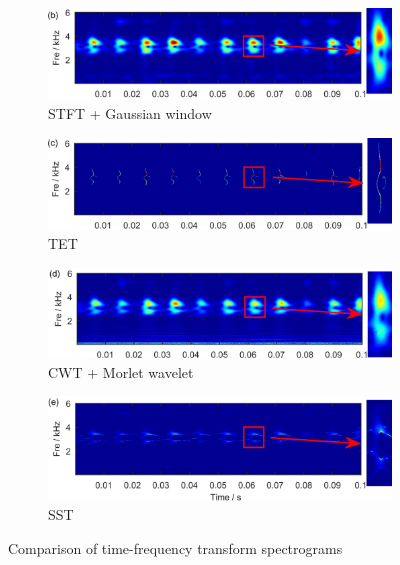\begin{figure}[ht]
    \centering
    \begin{subfigure}[b]{0.49\textwidth}
        \includegraphics[width=\textwidth]{assets/stft-spectrogram-sample.png}
        \caption{STFT + Gaussian window}
    \end{subfigure}
    \hfill
    \begin{subfigure}[b]{0.49\textwidth}
        \includegraphics[width=\textwidth]{assets/tet-spectrogram-sample.png}
        \caption{TET}
    \end{subfigure}
    \hfill
    \begin{subfigure}[b]{0.49\textwidth}
        \includegraphics[width=\textwidth]{assets/wt-spectrogram-sample.png}
        \caption{CWT + Morlet wavelet}
    \end{subfigure}
    \hfill
    \begin{subfigure}[b]{0.49\textwidth}
        \includegraphics[width=\textwidth]{assets/sst-spectrogram-sample.png}
        \caption{SST}
    \end{subfigure}
    \caption{Comparison of time-frequency transform spectrograms~\cite{yu_concentrated_2020}}
    \label{fig:transforms}
\end{figure}

